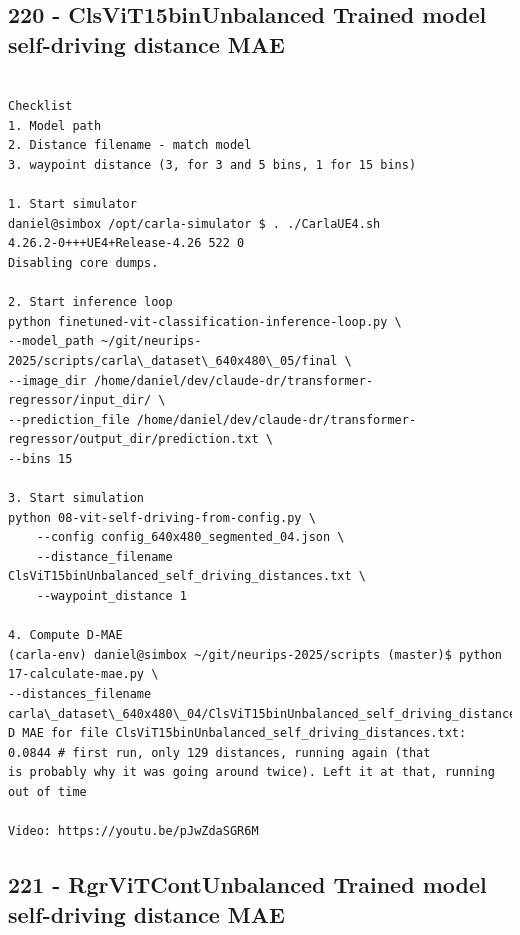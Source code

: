 \subsection{220 - ClsViT15binUnbalanced Trained model self-driving distance MAE}
\label{app_res:220}
\begin{verbatim}

Checklist
1. Model path
2. Distance filename - match model
3. waypoint distance (3, for 3 and 5 bins, 1 for 15 bins)

1. Start simulator
daniel@simbox /opt/carla-simulator $ . ./CarlaUE4.sh 
4.26.2-0+++UE4+Release-4.26 522 0
Disabling core dumps.

2. Start inference loop
python finetuned-vit-classification-inference-loop.py \
--model_path ~/git/neurips-2025/scripts/carla\_dataset\_640x480\_05/final \
--image_dir /home/daniel/dev/claude-dr/transformer-regressor/input_dir/ \
--prediction_file /home/daniel/dev/claude-dr/transformer-regressor/output_dir/prediction.txt \
--bins 15

3. Start simulation
python 08-vit-self-driving-from-config.py \
    --config config_640x480_segmented_04.json \
    --distance_filename ClsViT15binUnbalanced_self_driving_distances.txt \
    --waypoint_distance 1

4. Compute D-MAE
(carla-env) daniel@simbox ~/git/neurips-2025/scripts (master)$ python 17-calculate-mae.py \
--distances_filename carla\_dataset\_640x480\_04/ClsViT15binUnbalanced_self_driving_distances.txt
D MAE for file ClsViT15binUnbalanced_self_driving_distances.txt: 0.0844 # first run, only 129 distances, running again (that
is probably why it was going around twice). Left it at that, running out of time

Video: https://youtu.be/pJwZdaSGR6M

\end{verbatim}

\subsection{221 - RgrViTContUnbalanced Trained model self-driving distance MAE}
\label{app_res:221}

